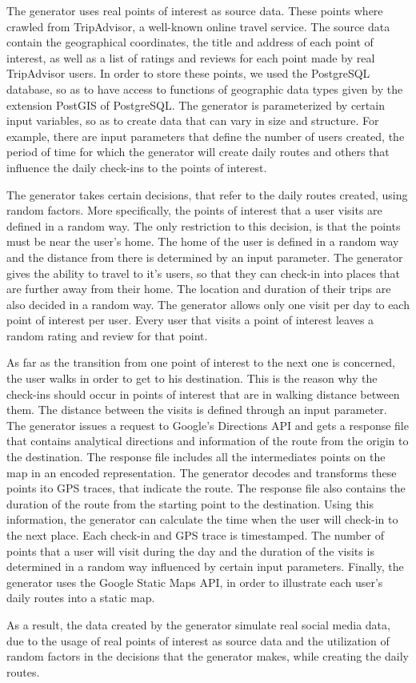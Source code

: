 The generator uses real points of interest as source data. These points where crawled from TripAdvisor, a well-known online travel service. 
The source data contain the geographical coordinates, the title and address of each point of interest, as well as a list of ratings and reviews for each point 
made by real TripAdvisor users. In order to store these points, we used the PostgreSQL database, so as to have access to functions of geographic data types 
given by the extension PostGIS of PostgreSQL. The generator is parameterized by certain input variables, so as to create data that can vary in size and structure. 
For example, there are input parameters that define the number of users created, the period of time for which the generator will create daily routes and 
others that influence the daily check-ins to the points of interest. 

The generator takes certain decisions, that refer to the daily routes created, using random factors. More specifically, the points of interest that a user visits 
are defined in a random way. The only restriction to this decision, is that the points must be near the user's home. The home of the user is defined in a random 
way and the distance from there is determined by an input parameter. The generator gives the ability to travel to it's users, so that they can check-in into 
places that are further away from their home. The location and duration of their trips are also decided in a random way. The generator 
allows only one visit per day to each point of interest per user. Every user that visits a point of interest leaves a random rating and review for that point.

As far as the transition from one point of interest to the next one is concerned, the user walks in order to get to his destination. This is the reason why 
the check-ins should occur in points of interest that are in walking distance between them. The distance between the visits is defined through an input 
parameter. The generator issues a request to Google's Directions API and gets a response file that contains analytical directions and information of the route 
from the origin to the destination. The response file includes all the intermediates points on the map in an encoded representation. The generator 
decodes and transforms these points ito GPS traces, that indicate the route. The response file also contains the duration of the route from the starting point to 
the destination. Using this information, the generator can calculate the time when the user will check-in to the next place. Each check-in and GPS trace is 
timestamped. The number of points that a user will visit during the day and the duration of the visits is determined in a random way influenced by 
certain input parameters. Finally, the generator uses the Google Static Maps API, in order to illustrate each user's daily routes into a static map.

As a result, the data created by the generator simulate real social media data, due to the usage of real points of interest as source data and 
the utilization of random factors in the decisions that the generator makes, while creating the daily routes.

















